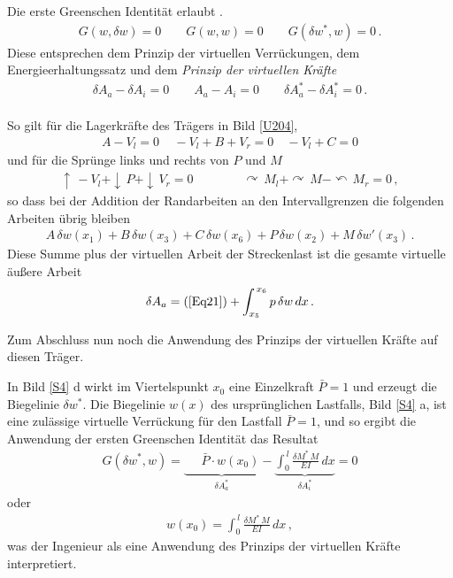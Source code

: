 Die erste Greenschen Identit\"{a}t erlaubt .
\begin{align}
G(w, \delta w) = 0 \qquad G(w,w) = 0 \qquad G(\delta w^*, w) = 0\,.
\end{align}
Diese entsprechen dem Prinzip der virtuellen Verr\"{u}ckungen, dem Energieerhaltungssatz und dem {\em Prinzip der virtuellen Kr\"{a}fte\/}
\begin{align}
\delta A_a - \delta A_i = 0 \qquad A_a - A_i = 0 \qquad \delta A_a^* - \delta A_i^* = 0\,.
\end{align}\\

So gilt f\"{u}r die Lagerkr\"{a}fte des Tr\"{a}gers in Bild \ref{U204},
\begin{align}
A - V_l = 0\, \quad  - V_l + B + V_r = 0 \quad - V_l + C = 0
\end{align}
und f\"{u}r die Spr\"{u}nge links und rechts von $P$ und $M$
\begin{align}
\uparrow\,- V_l + \downarrow\,P + \downarrow\,V_r = 0\qquad\qquad  \curvearrowright\, M_l + \curvearrowright\,M - \curvearrowleft\,M_r = 0\,,
\end{align}
so dass bei der Addition der Randarbeiten an den Intervallgrenzen die folgenden Arbeiten \"{u}brig bleiben
\begin{align}\label{Eq21}
A\,\delta w(x_1) + B\,\delta w(x_3) + C\,\delta w(x_6) + P\,\delta w(x_2) + M\,\delta w'(x_3)\,.
\end{align}
Diese Summe plus der virtuellen Arbeit der Streckenlast ist die gesamte virtuelle \"{a}u{\ss}ere Arbeit
\begin{align}
\delta A_a = \text{(\ref{Eq21})} + \int_{x_5}^{\,x_6} p\,\delta w\,dx\,.
\end{align}




Zum Abschluss nun noch die Anwendung des Prinzips der virtuellen Kr\"{a}fte auf diesen Tr\"{a}ger.

In Bild \ref{S4} d wirkt im Viertelspunkt $x_0$ eine Einzelkraft $\bar{P} = 1$ und erzeugt die Biegelinie $\delta w^*$. Die Biegelinie $w(x)$ des urspr\"{u}nglichen Lastfalls, Bild \ref{S4} a, ist eine zul\"{a}ssige virtuelle Verr\"{u}ckung f\"{u}r den Lastfall $\bar{P} = 1$, und so ergibt die Anwendung der ersten Greenschen Identit\"{a}t das Resultat
\begin{align}
G(\delta w^*,w) = \underbrace{\phantom{\int_0^{\,l} }\bar{P} \cdot w(x_0)}_{\delta A_a^*} - \underbrace{\int_0^{\,l} \frac{\delta M^*\,M}{EI}\,dx}_{\delta A_i^*} = 0
\end{align}
oder
\begin{align}
w(x_0) = \int_0^{\,l} \frac{\delta M^*\,M}{EI}\,dx\,,
\end{align}
was der Ingenieur als eine Anwendung des Prinzips der virtuellen Kr\"{a}fte interpretiert.\\

